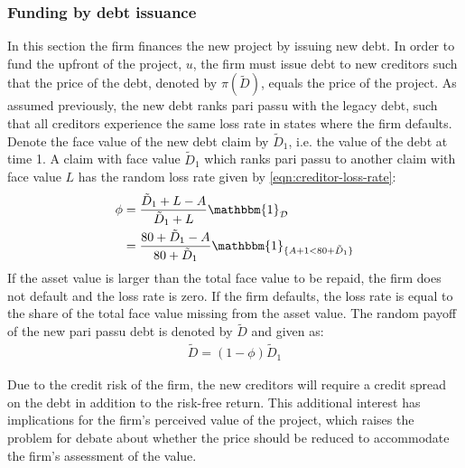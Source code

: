 \documentclass[main.tex]{subfiles}
\begin{document}
    \subsubsection{Funding by debt issuance}
    \label{sec:example-risk-free-project-debt-issuance}
        In this section the firm finances the new project by issuing new debt.
        In order to fund the upfront of the project, $u$, 
        the firm must issue debt to new creditors such that the price of the debt, 
        denoted by $\pi(\tilde{D})$, equals the price of the project.
        As assumed previously, the new debt ranks pari passu with the legacy debt, 
        such that all creditors experience the same loss rate in states where the firm defaults.
        Denote the face value of the new debt claim by $\tilde{D}_{1}$, 
        i.e. the value of the debt at time 1. 
        A claim with face value $\tilde{D}_{1}$ which ranks pari passu to another claim 
        with face value $L$ has the random loss rate given by \cref{eqn:creditor-loss-rate}:
            \begin{align}
                \phi
                &=
                    \frac{
                        \tilde{D}_{1} + L - A
                    }{
                        \tilde{D}_{1} + L
                    }
                    \mathbbm{1}_{\mathcal{D}}
                \nonumber \\
                &=
                    \frac{
                        \num{80} + \tilde{D}_{1} - A
                    }{
                        \num{80} + \tilde{D}_{1}
                    }
                    \mathbbm{1}_{\{A + \num{1} < \num{80} + \tilde{D}_{1}\}} 
            \end{align}
        If the asset value is larger than the total face value to be repaid,
        the firm does not default and the loss rate is zero.
        If the firm defaults, the loss rate is equal to the share of the total face value missing from the asset value.
        The random payoff of the new pari passu debt is denoted by $\tilde{D}$ and given as:
            \begin{align}
                \tilde{D}
                    = (1 - \phi)\tilde{D}_{1}
            \end{align}

        Due to the credit risk of the firm, the new creditors will require a credit spread on the debt 
        in addition to the risk-free return.
        This additional interest has implications for the firm's perceived value of the project, 
        which raises the problem for debate about whether the price should be reduced 
        to accommodate the firm's assessment of the value.
\end{document}
